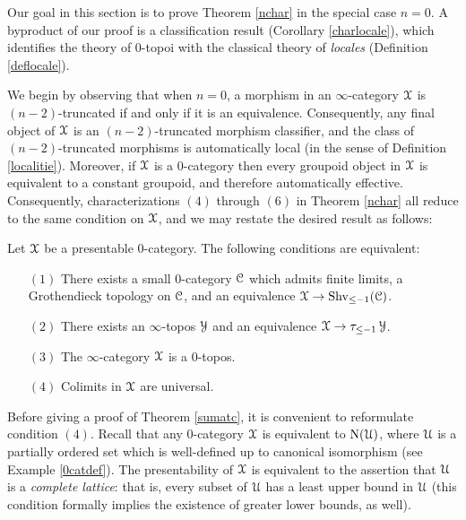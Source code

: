 Our goal in this section is to prove Theorem \ref{nchar} in the special case $n=0$. A byproduct of our proof is a classification result (Corollary \ref{charlocale}), which identifies the theory of $0$-topoi with the classical theory of {\em locales} (Definition \ref{deflocale}).

We begin by observing that when $n=0$, a morphism in an $\infty$-category $\operatorname{\mathcal{X}}$ is
$(n-2)$-truncated if and only if it is an equivalence. Consequently, any final object of $\operatorname{\mathcal{X}}$ is an $(n-2)$-truncated morphism classifier, and the class of $(n-2)$-truncated morphisms is automatically local (in the sense of Definition \ref{localitie}). 
Moreover, if $\operatorname{\mathcal{X}}$ is a $0$-category then every groupoid object in $\operatorname{\mathcal{X}}$ is equivalent to a constant groupoid, and therefore automatically effective. Consequently, characterizations $(4)$ through $(6)$ in Theorem \ref{nchar} all reduce to the same condition on $\operatorname{\mathcal{X}}$, and we may restate the desired result as follows:

\begin{theorem}\label{sumatc}
Let $\operatorname{\mathcal{X}}$ be a presentable $0$-category. The following conditions are equivalent:
\begin{itemize}
\item[$(1)$] There exists a small $0$-category $\operatorname{\mathcal{C}}$ which admits finite limits, 
a Grothendieck topology on $\operatorname{\mathcal{C}}$, and an equivalence $\operatorname{\mathcal{X}} \rightarrow \operatorname{Shv}_{\leq -1}(\operatorname{\mathcal{C}})$.
\item[$(2)$] There exists an $\infty$-topos $\operatorname{\mathcal{Y}}$ and an equivalence
$\operatorname{\mathcal{X}} \rightarrow \tau_{\leq -1} \operatorname{\mathcal{Y}}$.
\item[$(3)$] The $\infty$-category $\operatorname{\mathcal{X}}$ is a $0$-topos.
\item[$(4)$] Colimits in $\operatorname{\mathcal{X}}$ are universal.
\end{itemize}
\end{theorem}

Before giving a proof of Theorem \ref{sumatc}, it is convenient to reformulate
condition $(4)$. Recall that any $0$-category $\operatorname{\mathcal{X}}$ is equivalent to
$\operatorname{N}(\operatorname{\mathcal{U}})$, where $\operatorname{\mathcal{U}}$ is a partially ordered set which is well-defined up to canonical isomorphism (see Example \ref{0catdef}). The presentability of $\operatorname{\mathcal{X}}$ is equivalent to the assertion that $\operatorname{\mathcal{U}}$ is a {\em complete lattice}: that is, every subset of $\operatorname{\mathcal{U}}$ has a least upper bound in $\operatorname{\mathcal{U}}$ (this condition formally implies the existence of greater lower bounds, as well).

